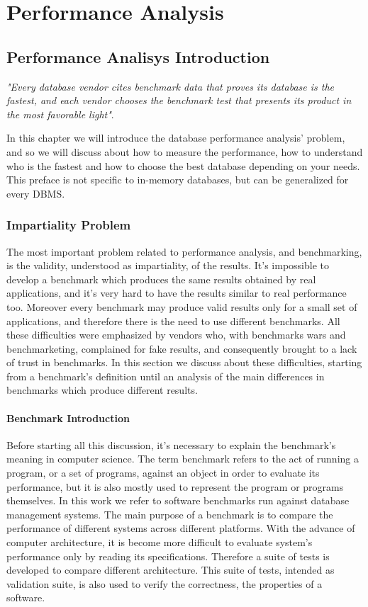 \part{Performance Analysis}

\chapter{Performance Analisys Introduction} \label{analysis-introduction}
\emph{"Every database vendor cites benchmark data that proves its database is the fastest, and each vendor chooses the benchmark test that presents its product in the most favorable light"}\cite{burleson}.

In this chapter we will introduce the database performance analysis' problem, and so we will discuss about how to measure the performance, how to understand who is the fastest and how to choose the best database depending on your needs. This preface is not specific to in-memory databases, but can be generalized for every DBMS.
	
	\section{Impartiality Problem}
The most important problem related to performance analysis, and benchmarking, is the validity, understood as impartiality, of the results. It's impossible to develop a benchmark which produces the same results obtained by real applications, and it's very hard to have the results similar to real performance too. Moreover every benchmark may produce valid results only for a small set of applications, and therefore there is the need to use different benchmarks. All these difficulties were emphasized by vendors who, with benchmarks wars and benchmarketing, complained for fake results, and consequently brought to a lack of trust in benchmarks. In this section we discuss about these difficulties, starting from a benchmark's definition until an analysis of the main differences in benchmarks which produce different results.

		\subsection{Benchmark Introduction}
Before starting all this discussion, it's necessary to explain the benchmark's meaning in computer science. The term benchmark refers to the act of running a program, or a set of programs, against an object in order to evaluate its performance, but it is also mostly used to represent the program or programs themselves. In this work we refer to software benchmarks run against database management systems. The main purpose of a benchmark is to compare the performance of different systems across different platforms. With the advance of computer architecture, it is become more difficult to evaluate system's performance only by reading its specifications. Therefore a suite of tests is developed to compare different architecture. This suite of tests, intended as validation suite, is also used to verify the correctness, the properties of a software. 

